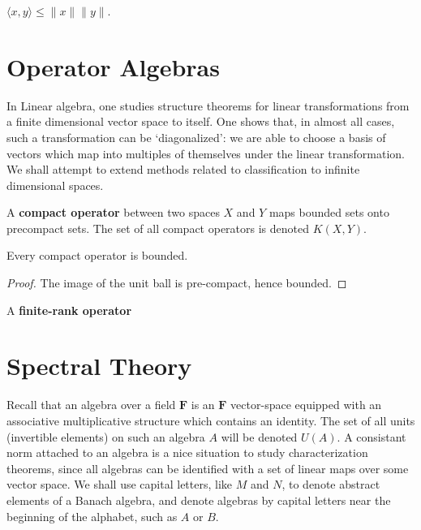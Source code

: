 \begin{theorem}
    $\langle x, y \rangle \leq \| x \| \| y \|$.
\end{theorem}




\chapter{Operator Algebras}

In Linear algebra, one studies structure theorems for linear transformations from a finite dimensional vector space to itself. One shows that, in almost all cases, such a transformation can be `diagonalized': we are able to choose a basis of vectors which map into multiples of themselves under the linear transformation. We shall attempt to extend methods related to classification to infinite dimensional spaces.

\begin{definition}
    A {\bf compact operator} between two spaces $X$ and $Y$ maps bounded sets onto precompact sets. The set of all compact operators is denoted $K(X,Y)$.
\end{definition}

\begin{lemma}
    Every compact operator is bounded.
\end{lemma}
\begin{proof}
    The image of the unit ball is pre-compact, hence bounded.
\end{proof}

\begin{definition}
    A {\bf finite-rank operator}
\end{definition}




\chapter{Spectral Theory}

Recall that an algebra over a field $\mathbf{F}$ is an $\mathbf{F}$ vector-space equipped with an associative multiplicative structure which contains an identity. The set of all units (invertible elements) on such an algebra $A$ will be denoted $U(A)$. A consistant norm attached to an algebra is a nice situation to study characterization theorems, since all algebras can be identified with a set of linear maps over some vector space. We shall use capital letters, like $M$ and $N$, to denote abstract elements of a Banach algebra, and denote algebras by capital letters near the beginning of the alphabet, such as $A$ or $B$.

